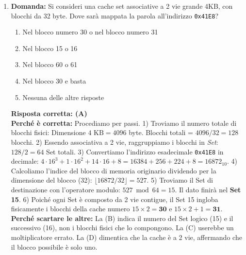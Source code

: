 \documentclass[12pt, a4paper]{article}
\begin{document}
\begin{enumerate}
    \item \textbf{Domanda:} Si consideri una cache set associative a 2 vie grande 4KB, con blocchi da 32 byte. Dove sarà mappata la parola all'indirizzo \texttt{0x41E8}?
    \begin{enumerate}[label=(\Alph*)]
        \item Nel blocco numero 30 o nel blocco numero 31
        \item Nel blocco 15 o 16
        \item Nel blocco 60 o 61
        \item Nel blocco 30 e basta
        \item Nessuna delle altre risposte
    \end{enumerate}
    \textbf{Risposta corretta: (A)} \\
    \textbf{Perché è corretta:} Procediamo per passi. 1) Troviamo il numero totale di blocchi fisici: Dimensione $4\text{ KB} = 4096$ byte. Blocchi totali = $4096 / 32 = 128$ blocchi. 2) Essendo associativa a 2 vie, raggruppiamo i blocchi in \textit{Set}: $128 / 2 = 64$ Set totali. 3) Convertiamo l'indirizzo esadecimale \texttt{0x41E8} in decimale: $4 \cdot 16^3 + 1 \cdot 16^2 + 14 \cdot 16 + 8 = 16384 + 256 + 224 + 8 = 16872_{10}$. 4) Calcoliamo l'indice del blocco di memoria originario dividendo per la dimensione del blocco (32): $\lfloor 16872 / 32 \rfloor = 527$. 5) Troviamo il Set di destinazione con l'operatore modulo: $527 \bmod 64 = 15$. Il dato finirà nel \textbf{Set 15}. 6) Poiché ogni Set è composto da 2 vie contigue, il Set 15 ingloba fisicamente i blocchi della cache numero $15 \times 2 = \textbf{30}$ e $15 \times 2 + 1 = \textbf{31}$. \\
    \textbf{Perché scartare le altre:} La (B) indica il numero del Set logico (15) e il successivo (16), non i blocchi fisici che lo compongono. La (C) userebbe un moltiplicatore errato. La (D) dimentica che la cache è a 2 vie, affermando che il blocco possibile è solo uno.

\newpage


\end{enumerate}
\end{document}
